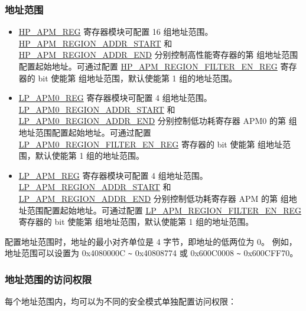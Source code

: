\documentclass[main\_\_CN.tex]{subfiles}
\begin{document}
\subsubsection{地址范围}
\begin{itemize}
    \item \hyperref[sec:permctrl-reg-hp]{HP\_APM\_REG} 寄存器模块可配置 16 组地址范围。\hyperref[regdesc:HPAPMREGION0ADDRSTARTREG]{HP\_APM\_REGION\_ADDR\_START} 和 \hyperref[regdesc:HPAPMREGION0ADDRENDREG]{HP\_APM\_REGION\_ADDR\_END} 分别控制高性能寄存器的第  组地址范围配置起始地址。可通过配置 \hyperref[fielddesc:HPAPMREGIONFILTEREN]{HP\_APM\_REGION\_FILTER\_EN\_REG} 寄存器的 bit  使能第  组地址范围，默认使能第 1 组的地址范围。
    
    \item \hyperref[sec:permctrl-reg-lp0]{LP\_APM0\_REG} 寄存器模块可配置 4 组地址范围。\hyperref[fielddesc:LPAPM0REGION0ADDRSTART]{LP\_APM0\_REGION\_ADDR\_START} 和 \hyperref[fielddesc:LPAPM0REGION0ADDREND]{LP\_APM0\_REGION\_ADDR\_END} 分别控制低功耗寄存器 APM0 的第  组地址范围配置起始地址。可通过配置 \hyperref[fielddesc:LPAPM0REGIONFILTEREN]{LP\_APM0\_REGION\_FILTER\_EN\_REG} 寄存器的 bit  使能第  组地址范围，默认使能第 1 组的地址范围。
    
    \item \hyperref[sec:permctrl-reg-lp]{LP\_APM\_REG} 寄存器模块可配置 4 组地址范围。\hyperref[fielddesc:LPAPMREGION0ADDRSTART]{LP\_APM\_REGION\_ADDR\_START} 和 \hyperref[fielddesc:LPAPMREGION0ADDREND]{LP\_APM\_REGION\_ADDR\_END} 分别控制低功耗寄存器 APM 的第  组地址范围配置起始地址。可通过配置 \hyperref[fielddesc:LPAPMREGIONFILTEREN]{LP\_APM\_REGION\_FILTER\_EN\_REG} 寄存器的 bit  使能第  组地址范围，默认使能第 1 组的地址范围。
   
\end{itemize}

配置地址范围时，地址的最小对齐单位是 4 字节，即地址的低两位为 0。 例如，地址范围可以设置为 0x4080000C \verb+~+ 0x40808774 或 0x600C0008 \verb+~+ 0x600CFF70。



\subsubsection{地址范围的访问权限}

每个地址范围内，均可以为不同的安全模式单独配置访问权限：
\end{document}
